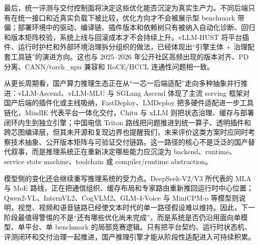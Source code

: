 最后，统一评测与交付控制面将决定这些优化能否沉淀为真实生产力。不同后端只有在统一接口和近真实负载下被比较，优化方向才不会被展示型 benchmark 带偏；部署环境中的驱动、编译链、插件版本和依赖树只有被纳入自动化诊断、回归和版本矩阵校验，系统上线与回滚成本才不会持续上升。vLLM-HUST 将平台插件、运行时护栏和外部环境治理拆分组织的做法，已经体现出“引擎主体 + 治理配套工具链”的演进方向\citep{vllmhust}。这也与 2025--2026 年公开社区高频出现的版本对齐、PD 分离、CANN/torch\_npu 兼容和 RoCE/HCCL 连通性问题相一致\citep{zhihu_vllm_ascend_guide,zhihu_vllm_pd_migration}。

从更长周期看，国产算力推理生态正在从“一芯一后端适配”走向多种抽象并行推进：vLLM-Ascend、vLLM-MLU 与 SGLang Ascend 体现了主流 serving 框架对国产后端的插件化或主线吸纳，FastDeploy、LMDeploy 把多硬件适配进一步工具链化，MindIE 代表平台一体化交付，Chitu 与 xLLM 则把状态治理、缓存与部署闭环内生到独立引擎；中国电信 Triton 路线把问题推进到统一算子、透明插件和跨芯图编译层，但其未开源和复现边界也提醒我们，未来评价这类方案时应同时考察技术抽象、公开版本矩阵与可验证交付链路\citep{vllmascend,vllmmlu,sglang_ascend_npu,fastdeploy_docs,lmdeploy_install,mindie,chitu_github,xllm_tech_report,chinatelecom_triton_validation_2025}。这一路径的核心不是泛泛的国产替代叙事，而是推理系统正在重新决定哪些能力应沉淀为 backend、runtime、service state machine、toolchain 或 compiler/runtime abstraction。

模型侧的变化还会继续重写推理系统的受力点。DeepSeek-V2/V3 所代表的 MLA 与 MoE 路线，正在把通信组织、缓存布局和专家路由重新推回运行时中心位置\citep{liu2024deepseekv2,deepseekv3}；Qwen2-VL、InternVL2、CogVLM2、GLM-4-Voice 与 MiniCPM-o 等模型则说明，视觉、视频和语音链路已经使文本时代的单一路径假设难以维持\citep{wang2024qwen2vl,chen2024internvl2,wang2024cogvlm2,zeng2024glm4voice,cui2026minicpmo45}。因此，下一阶段最值得警惕的不是“还有哪些优化尚未完成”，而是系统是否仍沿用面向单模型、单平台、单 benchmark 的局部竞赛逻辑。只有把平台契约、运行时状态机、评测闭环和交付治理一起推进，国产推理引擎才能从阶段性适配进入可持续积累。
